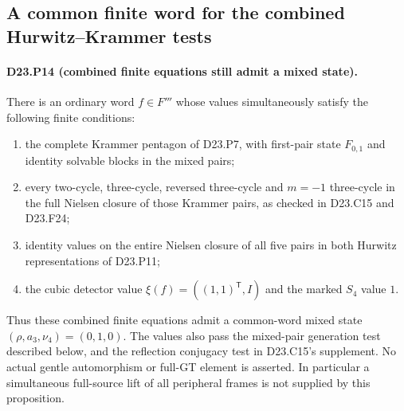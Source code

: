 \subsection{A common finite word for the combined Hurwitz--Krammer tests}

\paragraph{D23.P14 (combined finite equations still admit a mixed state).}
There is an ordinary word $f\in F'''$ whose values simultaneously
satisfy the following finite conditions:
\begin{enumerate}
\item the complete Krammer pentagon of D23.P7, with first-pair
state $F_{0,1}$ and identity solvable blocks in the mixed pairs;
\item every two-cycle, three-cycle, reversed three-cycle and
$m=-1$ three-cycle in the full Nielsen closure of those Krammer
pairs, as checked in D23.C15 and D23.F24;
\item identity values on the entire Nielsen closure of all five
pairs in both Hurwitz representations of D23.P11;
\item the cubic detector value $\xi(f)=((1,1)^{\mathsf T},I)$
and the marked $S_4$ value $1$.
\end{enumerate}
Thus these combined finite equations admit a common-word mixed
state $(\rho,a_3,\nu_4)=(0,1,0)$.
The values also pass the mixed-pair generation test described
below, and the reflection conjugacy test in D23.C15's supplement.
No actual gentle automorphism or full-GT element is asserted.
In particular a simultaneous full-source lift of all peripheral
frames is not supplied by this proposition.


